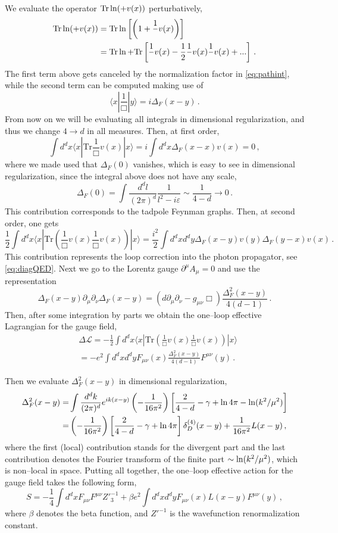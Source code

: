 \documentclass[11pt,a4paper]{article}
\newcommand{\be}{\begin{equation}}
\newcommand{\ee}{\end{equation}}
\newcommand\m{\mu}
\newcommand\g{\gamma}
\newcommand\n{\nu}
\def\d{\partial}
\renewcommand{\ln}{\mathop{\rm ln}\nolimits}
\begin{document}
We evaluate the operator $\text{Tr}\ln(\Box +v(x))$ perturbatively,
\be
\begin{split}
 \text{Tr}\ln(\Box +v(x))&=\text{Tr}\ln\left[\Box\left( 1+\frac{1}{\Box}v(x)\right)\right]\\
&= \text{Tr}\ln \Box + \text{Tr}\left[\frac{1}{\Box}v(x)-\frac{1}{2}\frac{1}{\Box}v(x)\frac{1}{\Box}v(x)+...\right]\,.
\end{split}
\ee
The first term above gets canceled by the normalization factor in \eqref{eq:pathint},
while the second term can be computed making use of
\be
\langle x| \frac{1}{ \Box}  |y\rangle =i\Delta_F(x-y)\,.
\ee
From now on we will be evaluating all integrals in dimensional regularization, and thus we change $4\to d$ in all measures.
Then, at first order,
\be
\int  d^dx \langle x| \text{Tr}\frac{1}{\Box} v(x) |x \rangle =i\int  d^dx
\Delta_F(x-x)v(x)=0\,,
\ee
where we made used that
$\Delta_F(0)$ vanishes, which is easy to see in dimensional regularization, since the integral above does not have any scale,
\be
\Delta_F(0)=\int \frac{d^dl}{(2\pi)^d}\frac{1}{l^2-i\varepsilon}\sim \frac{1}{4-d}\to 0\,.
\ee
This contribution corresponds to the tadpole Feynman graphs.
Then, at second order, one gets
\be
\frac{1}{2}\int  d^dx \langle x| \text{Tr}
\left(\frac{1}{\Box}v(x)\frac{1}{\Box}v(x)\right) |x \rangle
=\frac{i^2}{2}\int  d^dx d^dy
\Delta_F(x-y)v(y)\Delta_F(y-x)v(x)\,.
\ee
This contribution represents the loop correction
into the photon propagator, see \eqref{eq:diagQED}.
Next we go to the Lorentz gauge $\d^\m A_\mu=0$
and use the representation
\be
\Delta_F(x-y)\d_\mu \d_\nu \Delta_F(x-y)=(d\d_\m \d_\n -g_{\mu \nu}\Box)\frac{\Delta^2_F(x-y)}{4(d-1)} \,.
\ee
Then, after some integration by parts we obtain the one--loop effective Lagrangian for the gauge field,
\be
\label{eq:eact1}
\begin{split}
&\Delta \mathcal{L}=-\frac{1}{2}\int  d^dx \langle x| \text{Tr}
\left(\frac{1}{\Box}v(x)\frac{1}{\Box}v(x)\right)  |x \rangle  \\
&=
-e^2\int d^dx d^dy F_{\m\nu}(x)\frac{\Delta^2_F(x-y)}{4(d-1)}F^{\m\nu}(y)\,.
\end{split}
\ee

Then we evaluate $\Delta^2_F(x-y)$ in dimensional regularization,
\be
\begin{split}
\Delta^2_F(x-y)=&\int \frac{d^d k}{(2\pi)^{d}} e^{ik(x-y)}\left(-\frac{1}{16\pi^2}\right)
\left[\frac{2}{4-d}-\g+\ln 4\pi-\ln (k^2/\mu^2)\right]\\
=&\left(-\frac{1}{16\pi^2}\right)
\left[\frac{2}{4-d}-\g+\ln 4\pi\right]\delta_D^{(4)}(x-y)+\frac{1}{16\pi^2}L(x-y)\,,
\end{split}
\ee
where the first (local) contribution stands for the divergent part and
the last contribution denotes the Fourier transform of the finite part $\sim \ln(k^2/\mu^2)$, which is
non--local in space. Putting all together, the one--loop effective action for
the gauge field takes the following form,
\be
S=-\frac{1}{4}\int d^dx  F_{\mu\nu}F^{\mu\nu}Z'^{-1}_3+\beta e^2 \int d^dx d^dy
F_{\mu \nu}(x)L(x-y)F^{\mu \nu}(y)\,,
\ee
where $\beta$ denotes the beta function, and $Z'^{-1}$ is the wavefunction
renormalization constant.
\end{document}
